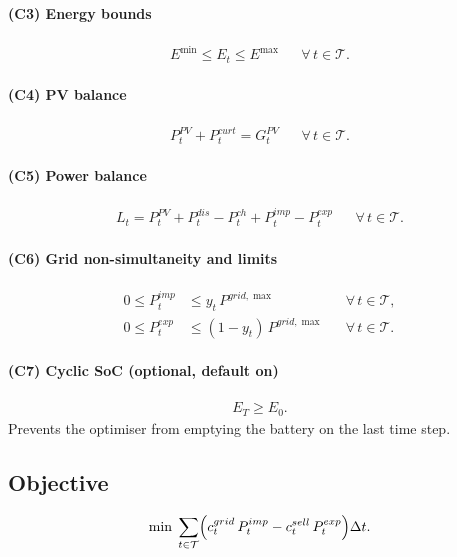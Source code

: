 \documentclass{article}
\begin{document}
\paragraph{(C3) Energy bounds}
\begin{align}
  E^{\min} \le E_t \le E^{\max} && \forall\,t \in \mathcal{T}. \label{eq:C3}
\end{align}

\paragraph{(C4) PV balance}
\begin{align}
  P^{PV}_t + P^{curt}_t = G^{PV}_t && \forall\,t \in \mathcal{T}. \label{eq:C4}
\end{align}

\paragraph{(C5) Power balance}
\begin{align}
  L_t = P^{PV}_t + P^{dis}_t - P^{ch}_t + P^{imp}_t - P^{exp}_t
  && \forall\,t \in \mathcal{T}. \label{eq:C5}
\end{align}

\paragraph{(C6) Grid non-simultaneity and limits}
\begin{align}
  0 \le P^{imp}_t &\le y_t \, P^{grid,\max}           && \forall\,t \in \mathcal{T}, \label{eq:C6_imp} \\
  0 \le P^{exp}_t &\le (1-y_t)\,P^{grid,\max}         && \forall\,t \in \mathcal{T}. \label{eq:C6_exp}
\end{align}

\paragraph{(C7) Cyclic SoC (optional, default on)}
\begin{align}
  E_T \ge E_0. \label{eq:C7}
\end{align}
Prevents the optimiser from emptying the battery on the last time step.

\subsection{Objective}
\begin{equation}
  \min \;\sum_{t \in \mathcal{T}}
  \Bigl(c^{grid}_t\,P^{imp}_t - c^{sell}_t\,P^{exp}_t\Bigr)\Delta t.
  \label{eq:OBJ_base}
\end{equation}
\end{document}
